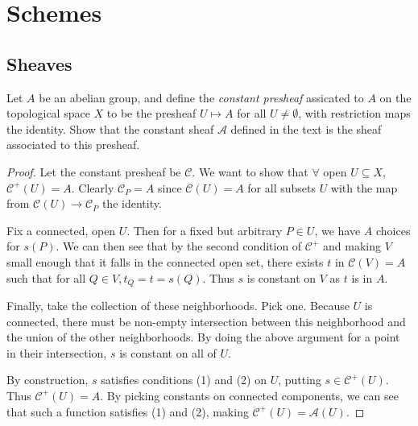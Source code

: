 \section{Schemes}

\subsection{Sheaves}

\begin{exercise}%
	Let $A $ be an abelian group, and define the \textit{constant presheaf} assicated to $A $ on the topological space $X $ to be the presheaf $U\mapsto A $ for all $U\ne \emptyset $, with restriction maps the identity. Show that the constant sheaf $\mathcal{A} $ defined in the text is the sheaf associated to this presheaf.
\end{exercise}
\begin{proof}
	Let the constant presheaf be $\mathcal{C} $.
	We want to show that $\forall $ open $U \subseteq X$, $\mathcal{C}^+(U) = A $.
	Clearly $\mathcal{C}_P = A $ since $\mathcal{C}(U) = A$ for all subsets $U $ with the map from $\mathcal{C}(U) \to \mathcal{C}_P $ the identity.

	Fix a connected, open $U $.
	Then for a fixed but arbitrary $P \in U $, we have $A $ choices for $s(P) $.
	We can then see that by the second condition of $\mathcal{C}^+ $ and making $V $ small enough that it falls in the connected open set, there exists $t$ in $\mathcal{C}(V) = A$ such that for all $Q \in V, t_Q = t = s(Q)$.
	Thus $s $ is constant on $V $ as $t $ is in $A $.

	Finally, take the collection of these neighborhoods.
	Pick one.
	Because $U $ is connected, there must be non-empty intersection between this neighborhood and the union of the other neighborhoods.
	By doing the above argument for a point in their intersection, $s $ is constant on all of $U $.

	By construction, $s $ satisfies conditions (1) and (2) on $U $, putting $s \in \mathcal{C}^+(U) $.
	Thus $\mathcal{C}^+(U) = A $.
	By picking constants on connected components, we can see that such a function satisfies (1) and (2), making $\mathcal{C}^+(U) = \mathcal{A}(U) $.
\end{proof}

